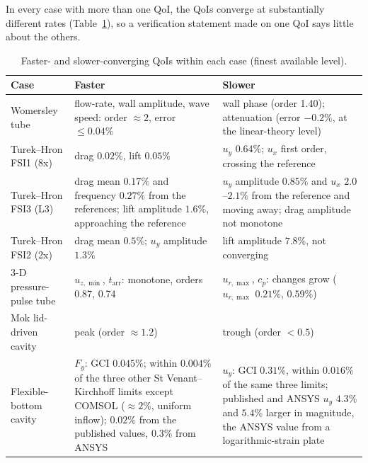 In every case with more than one QoI, the QoIs converge at substantially different rates (Table~\ref{tab:qoi_dependence}), so a verification statement made on one QoI says little about the others.

\begin{table}[htbp]
	\centering
	\footnotesize
	\setlength{\tabcolsep}{3pt}
	\caption{Faster- and slower-converging QoIs within each case (finest available level).}
	\label{tab:qoi_dependence}
	\begin{tabular}{p{2.8cm}p{5.4cm}p{5.4cm}}
		\toprule
		Case & Faster & Slower \\
		\midrule
		Womersley tube & flow-rate, wall amplitude, wave speed: order $\approx2$, error $\leq0.04\%$ & wall phase (order 1.40); attenuation (error $-0.2\%$, at the linear-theory level) \\
		Turek--Hron FSI1 (8x) & drag $0.02\%$, lift $0.05\%$ & $u_y$ $0.64\%$; $u_x$ first order, crossing the reference \\
		Turek--Hron FSI3 (L3) & drag mean $0.17\%$ and frequency $0.27\%$ from the references; lift amplitude $1.6\%$, approaching the reference & $u_y$ amplitude $0.85\%$ and $u_x$ $2.0$--$2.1\%$ from the reference and moving away; drag amplitude not monotone \\
		Turek--Hron FSI2 (2x) & drag mean $0.5\%$; $u_y$ amplitude $1.3\%$ & lift amplitude $7.8\%$, not converging \\
		3-D pressure-pulse tube & $u_{z,\min}$, $t_\mathrm{arr}$: monotone, orders 0.87, 0.74 & $u_{r,\max}$, $c_p$: changes grow ($u_{r,\max}$ $0.21\%$, $0.59\%$) \\
		Mok lid-driven cavity & peak (order $\approx1.2$) & trough (order $<0.5$) \\
		Flexible-bottom cavity & $F_y$: GCI $0.045\%$; within $0.004\%$ of the three other St Venant--Kirchhoff limits except COMSOL ($\approx2\%$, uniform inflow); $0.02\%$ from the published values, $0.3\%$ from ANSYS & $u_y$: GCI $0.31\%$, within $0.016\%$ of the same three limits; published and ANSYS $u_y$ $4.3\%$ and $5.4\%$ larger in magnitude, the ANSYS value from a logarithmic-strain plate \\
				\bottomrule
	\end{tabular}
\end{table}


